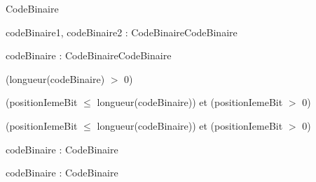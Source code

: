 \begin{algorithme}

    {}{CodeBinaire}

    {codeBinaire1, codeBinaire2 : CodeBinaire}{CodeBinaire}

    {}
    {}

    {codeBinaire : CodeBinaire}{CodeBinaire}

    {}
    {(longueur(codeBinaire) $>$ 0)}

    {}

    {}
    {}
    {(positionIemeBit $\leq$ longueur(codeBinaire)) et (positionIemeBit $>$ 0)}

    {}
    {}
    {(positionIemeBit $\leq$ longueur(codeBinaire)) et (positionIemeBit $>$ 0)}

    {codeBinaire : CodeBinaire}{\naturelNonNul}

    {codeBinaire : CodeBinaire}{\booleenl}

\end{algorithme}